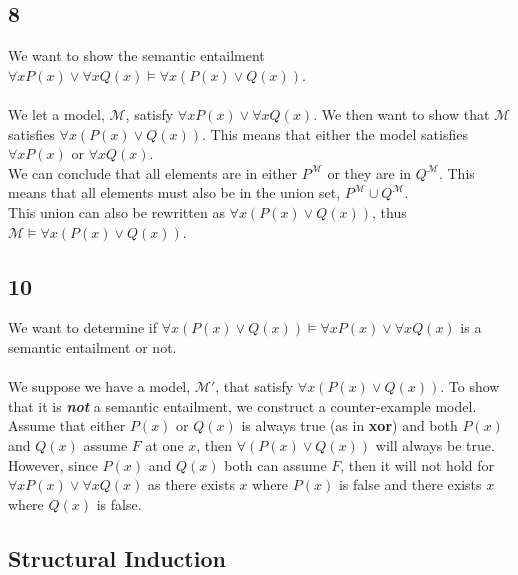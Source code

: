 \documentclass[12pt]{article}
\begin{document}
\subsection*{8}
We want to show the semantic entailment $\forall xP(x)\lor\forall xQ(x)\models \forall x(P(x)\lor Q(x))$.\\
\\
We let a model, $\mathcal{M}$, satisfy $\forall xP(x)\lor\forall xQ(x)$. We then want to show that $\mathcal{M}$ satisfies $\forall x(P(x)\lor Q(x))$. This means that either the model satisfies $\forall xP(x)$ or $\forall xQ(x)$. \\
We can conclude that all elements are in either $P^{\mathcal{M}}$ or they are in $Q^{\mathcal{M}}$. This means that all elements must also be in the union set, $P^{\mathcal{M}} \cup Q^{\mathcal{M}}$.\\
This union can also be rewritten as $\forall x(P(x)\lor Q(x))$, thus $\mathcal{M}\models \forall x(P(x)\lor Q(x))$.

\subsection*{10}
We want to determine if $\forall x(P(x)\lor Q(x))\models \forall xP(x)\lor\forall xQ(x)$ is a semantic entailment or not.\\
\\
We suppose we have a model, $\mathcal{M}'$, that satisfy $\forall x(P(x)\lor Q(x))$. To show that it is \textit{\textbf{not}} a semantic entailment, we construct a counter-example model. Assume that either $P(x)$ or $Q(x)$ is always true (as in \textbf{xor}) and both $P(x)$ and $Q(x)$ assume $F$ at one $x$, then $\forall (P(x)\lor Q(x))$ will always be true. However, since $P(x)$ and $Q(x)$ both can assume $F$, then it will not hold for $\forall xP(x)\lor\forall xQ(x)$ as there exists $x$ where $P(x)$ is false and there exists $x$ where $Q(x)$ is false.

\subsection*{Structural Induction}
\end{document}
